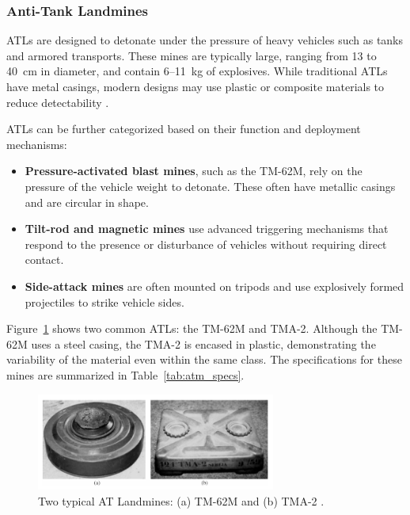 \subsubsection{Anti-Tank Landmines}

ATLs are designed to detonate under the pressure of heavy vehicles such as tanks and armored transports. These mines are typically large, ranging from 13 to 40~cm in diameter, and contain 6–11~kg of explosives. While traditional ATLs have metal casings, modern designs may use plastic or composite materials to reduce detectability \cite{paik2002image}.

ATLs can be further categorized based on their function and deployment mechanisms:
\begin{itemize}
    \item \textbf{Pressure-activated blast mines}, such as the TM-62M, rely on the pressure of the vehicle weight to detonate. These often have metallic casings and are circular in shape.
    \item \textbf{Tilt-rod and magnetic mines} use advanced triggering mechanisms that respond to the presence or disturbance of vehicles without requiring direct contact.
    \item \textbf{Side-attack mines} are often mounted on tripods and use explosively formed projectiles to strike vehicle sides.
\end{itemize}

Figure~\ref{fig:atm_examples} shows two common ATLs: the TM-62M and TMA-2. Although the TM-62M uses a steel casing, the TMA-2 is encased in plastic, demonstrating the variability of the material even within the same class. The specifications for these mines are summarized in Table~\ref{tab:atm_specs}.

\begin{figure}[h]
    \centering
    \includegraphics[width=0.7\textwidth]{figs/Huirui/atm_examples.png}
    \caption{Two typical AT Landmines: (a) TM-62M and (b) TMA-2 \cite{paik2002image}.}
    \label{fig:atm_examples}
\end{figure}


